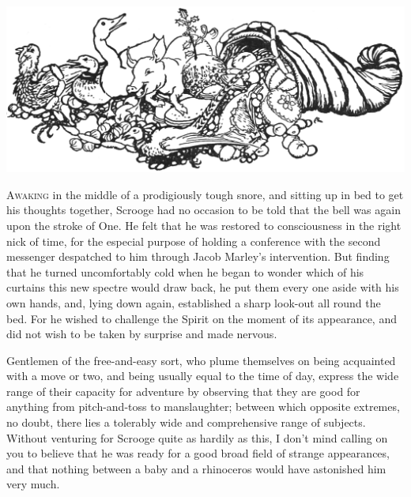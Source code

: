 \documentclass[paper=5.5in:8.5in,BCOR=10mm,twoside,DIV=15,12pt,usegeometry,openany]{scrbook} %
\begin{document}
\begin{minipage}[c]{\linewidth}
\includegraphics[width=\linewidth]{cornucopia}
\end{minipage}

\lettrine[loversize=.85]{A}{waking} in the middle of a prodigiously tough snore, and sitting up in bed to get his thoughts together, Scrooge had no occasion to be told that the bell was again upon the stroke of One. He felt that he was restored to consciousness in the right nick of time, for the especial purpose of holding a conference with the second messenger despatched to him through Jacob Marley's intervention. But finding that he turned uncomfortably cold when he began to wonder which of his curtains this new spectre would draw back, he put them every one aside with his own hands, and, lying down again, established a sharp look-out all round the bed. For he wished to challenge the Spirit on the moment of its appearance, and did not wish to be taken by surprise and made nervous.

Gentlemen of the free-and-easy sort, who plume themselves on being acquainted with a move or two, and being usually equal to the time of day, express the wide range of their capacity for adventure by observing that they are good for anything from pitch-and-toss to manslaughter; between which opposite extremes, no doubt, there lies a tolerably wide and comprehensive range of subjects. Without venturing for Scrooge quite as hardily as this, I don't mind calling on you to believe that he was ready for a good broad field of strange appearances, and that nothing between a baby and a rhinoceros would have astonished him very much.
\end{document}
